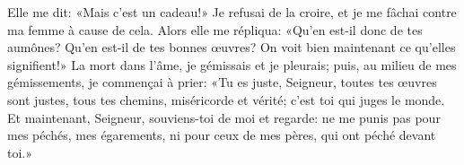 Elle me dit: «Mais c’est un cadeau!»
Je refusai de la croire, et je me fâchai contre ma femme à cause de cela.
Alors elle me répliqua: «Qu’en est-il donc de tes aumônes?
Qu’en est-il de tes bonnes œuvres?
On voit bien maintenant ce qu’elles signifient!»
La mort dans l’âme, je gémissais et je pleurais;
	puis, au milieu de mes gémissements, je commençai à prier:
	«Tu es juste, Seigneur, toutes tes œuvres sont justes,
	tous tes chemins, miséricorde et vérité; c’est toi qui juges le monde.
Et maintenant, Seigneur, souviens-toi de moi et regarde:
	ne me punis pas pour mes péchés, mes égarements,
	ni pour ceux de mes pères, qui ont péché devant toi.»
